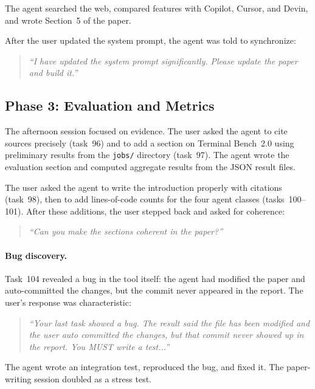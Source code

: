\documentclass{article}
\begin{document}
The agent searched the web, compared features with Copilot, Cursor, and Devin, and wrote Section~5 of the paper.

After the user updated the system prompt, the agent was told to synchronize:

\begin{quote}
\textit{``I have updated the system prompt significantly.  Please update the paper and build it.''}
\end{quote}

\subsection{Phase 3: Evaluation and Metrics}
\label{sec:phase3}

The afternoon session focused on evidence.  The user asked the agent to cite sources precisely (task~96) and to add a section on Terminal Bench~2.0 using preliminary results from the \texttt{jobs/} directory (task~97).  The agent wrote the evaluation section and computed aggregate results from the JSON result files.

The user asked the agent to write the introduction properly with citations (task~98), then to add lines-of-code counts for the four agent classes (tasks~100--101).  After these additions, the user stepped back and asked for coherence:

\begin{quote}
\textit{``Can you make the sections coherent in the paper?''}
\end{quote}

\paragraph{Bug discovery.}  Task~104 revealed a bug in the tool itself: the agent had modified the paper and auto-committed the changes, but the commit never appeared in the report.  The user's response was characteristic:

\begin{quote}
\textit{``Your last task showed a bug.  The result said the file has been modified and the user auto committed the changes, but that commit never showed up in the report.  You MUST write a test...''}
\end{quote}

The agent wrote an integration test, reproduced the bug, and fixed it.  The paper-writing session doubled as a stress test.
\end{document}
